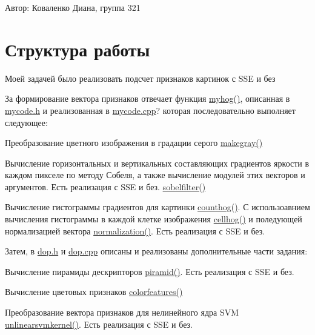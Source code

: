 Автор\-: Коваленко Диана, группа 321

\section*{Структура работы }

Моей задачей было реализовать подсчет признаков картинок с S\-S\-E и без

За формирование вектора признаков отвечает функция \hyperlink{mycode_8cpp_a845987e96a773cd6890701a05e8938fe}{myhog()}, описанная в \hyperlink{mycode_8h}{mycode.\-h} и реализованная в \hyperlink{mycode_8cpp}{mycode.\-cpp}? которая последовательно выполняет следующее\-:


\begin{DoxyItemize}
\item Преобразование цветного изображения в градации серого \hyperlink{mycode_8cpp_a7359fc03c50cd3954a42f47f974dc469}{makegray()}
\item Вычисление горизонтальных и вертикальных составляющих градиентов яркости в каждом пикселе по методу Собеля, а также вычисление модулей этих векторов и аргументов. Есть реализация с S\-S\-E и без. \hyperlink{mycode_8cpp_a8329cdf91c6f2409b5af537793c6d0da}{sobelfilter()}
\item Вычисление гистограммы градиентов для картинки \hyperlink{mycode_8h_a9d290f33fce5aae756b3ac1ad86acaa1}{counthog()}. С использоавнием вычисления гистограммы в каждой клетке изображения \hyperlink{mycode_8cpp_a01022a402a859e09ed2bb0ae3b88ae9b}{cellhog()} и поледующей нормализацией вектора \hyperlink{mycode_8cpp_aec92cdf4db0fce10e0c7bc32c05c1f1b}{normalization()}. Есть реализация с S\-S\-E и без.
\end{DoxyItemize}

Затем, в \hyperlink{dop_8h}{dop.\-h} и \hyperlink{dop_8cpp}{dop.\-cpp} описаны и реализованы дополнительные части задания\-:


\begin{DoxyItemize}
\item Вычисление пирамиды дескрипторов \hyperlink{dop_8cpp_a10901fc7716198de2e003ddb4c918802}{piramid()}. Есть реализация с S\-S\-E и без.
\item Вычисление цветовых признаков \hyperlink{dop_8cpp_a6af5688c03787a6b2aef1690f8f3f074}{colorfeatures()}
\item Преобразование вектора признаков для нелинейного ядра S\-V\-M \hyperlink{dop_8cpp_a618f8cc9cbf4a1a317a82855a9fa131e}{unlinearsvmkernel()}. Есть реализация с S\-S\-E и без.
\end{DoxyItemize}

